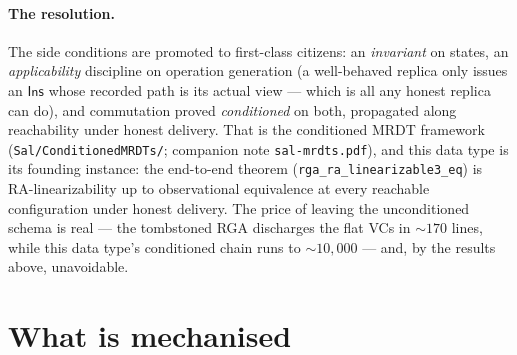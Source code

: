 \documentclass[11pt]{article}
\newcommand{\Ins}{\mathsf{Ins}}
\begin{document}
\paragraph{The resolution.} The side conditions are promoted to first-class
citizens: an \emph{invariant} on states, an \emph{applicability} discipline on
operation generation (a well-behaved replica only issues an $\Ins$ whose
recorded path is its actual view --- which is all any honest replica can do),
and commutation proved \emph{conditioned} on both, propagated along
reachability under honest delivery. That is the conditioned MRDT framework
(\texttt{Sal/ConditionedMRDTs/}; companion note
\texttt{sal-mrdts.pdf}), and this data type is its founding instance:
the end-to-end theorem
(\texttt{rga\_ra\_linearizable3\_eq}) is RA-linearizability up
to observational equivalence at every reachable configuration under honest
delivery. The price of leaving the unconditioned schema is real --- the
tombstoned RGA discharges the flat VCs in ${\sim}170$ lines, while this data
type's conditioned chain runs to ${\sim}10{,}000$ --- and, by the results
above, unavoidable.

\section{What is mechanised}
\label{sec:mech}
\end{document}
